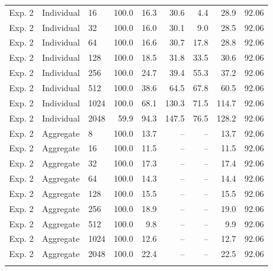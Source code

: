 \begin{table}[!t]
\begin{tabular}{@{}lllrrrrrr@{}}
Exp. 2 & Individual & 16 & 100.0 & 16.3 & 30.6 & 4.4 & 28.9 & 92.06 \\
Exp. 2 & Individual & 32 & 100.0 & 16.0 & 30.1 & 9.0 & 28.5 & 92.06 \\
Exp. 2 & Individual & 64 & 100.0 & 16.6 & 30.7 & 17.8 & 28.8 & 92.06 \\
Exp. 2 & Individual & 128 & 100.0 & 18.5 & 31.8 & 33.5 & 30.6 & 92.06 \\
Exp. 2 & Individual & 256 & 100.0 & 24.7 & 39.4 & 55.3 & 37.2 & 92.06 \\
Exp. 2 & Individual & 512 & 100.0 & 38.6 & 64.5 & 67.8 & 60.5 & 92.06 \\
Exp. 2 & Individual & 1024 & 100.0 & 68.1 & 130.3 & 71.5 & 114.7 & 92.06 \\
Exp. 2 & Individual & 2048 & 59.9 & 94.3 & 147.5 & 76.5 & 128.2 & 92.06 \\
\addlinespace[2pt]
Exp. 2 & Aggregate & 8 & 100.0 & 13.7 & -- & -- & 13.7 & 92.06 \\
Exp. 2 & Aggregate & 16 & 100.0 & 11.5 & -- & -- & 11.5 & 92.06 \\
Exp. 2 & Aggregate & 32 & 100.0 & 17.3 & -- & -- & 17.4 & 92.06 \\
Exp. 2 & Aggregate & 64 & 100.0 & 14.3 & -- & -- & 14.4 & 92.06 \\
Exp. 2 & Aggregate & 128 & 100.0 & 15.5 & -- & -- & 15.5 & 92.06 \\
Exp. 2 & Aggregate & 256 & 100.0 & 18.9 & -- & -- & 19.0 & 92.06 \\
Exp. 2 & Aggregate & 512 & 100.0 & 9.8 & -- & -- & 9.9 & 92.06 \\
Exp. 2 & Aggregate & 1024 & 100.0 & 12.6 & -- & -- & 12.7 & 92.06 \\
Exp. 2 & Aggregate & 2048 & 100.0 & 22.4 & -- & -- & 22.5 & 92.06 \\
\addlinespace[2pt]
\bottomrule
\end{tabular}
\end{table}
